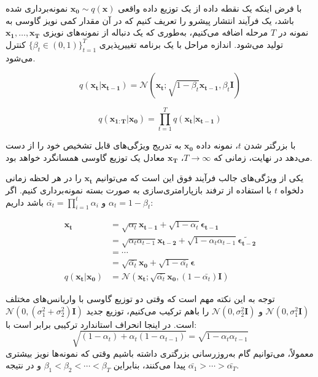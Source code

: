 با فرض اینکه یک نقطه داده از یک توزیع داده واقعی $ \mathbf{x_0} \sim q(\mathbf{x}) $ نمونه‌برداری شده باشد، یک فرآیند انتشار پیشرو را تعریف کنیم که در آن مقدار کمی نویز گاوسی به نمونه در $ T $ مرحله اضافه می‌کنیم، به‌طوری که یک دنباله از نمونه‌های نویزی $ \mathbf{x_1}, \ldots, \mathbf{x_T} $ تولید می‌شود. اندازه مراحل با یک برنامه تغییرپذیری $\{\beta_t \in (0, 1)\}_{t=1}^{T}$ کنترل می‌شود.

\begin{equation}
	q(\mathbf{x_t}|\mathbf{x_{t-1}}) = \mathcal{N}(\mathbf{x_t}; \sqrt{1 - \beta_t} \mathbf{x_{t-1}}, \beta_t \mathbf{I})
\end{equation}

\begin{equation}
	q(\mathbf{x_{1:T}}|\mathbf{x_0}) = \prod_{t=1}^{T} q(\mathbf{x_t}|\mathbf{x_{t-1}})
\end{equation}

با بزرگتر شدن $ t $، نمونه داده $ \mathbf{x_0} $ به تدریج ویژگی‌های قابل تشخیص خود را از دست می‌دهد  در نهایت، زمانی که $ T \to \infty $، $\mathbf{x_T}$ معادل یک توزیع گاوسی همسانگرد خواهد بود.






یکی از ویژگی‌های جالب فرآیند فوق این است که می‌توانیم $\mathbf{x_t}$ را در هر لحظه زمانی دلخواه $t$ با استفاده از ترفند بازپارامتری‌سازی به صورت بسته نمونه‌برداری کنیم. اگر $\alpha_t = 1 - \beta_t$ و $\bar{\alpha_t} = \prod_{i=1}^{t} \alpha_i$ باشد داریم:

\begin{equation}
	\begin{aligned}
		\mathbf{x_t} &= \sqrt{\alpha_t} \mathbf{x_{t-1}} + \sqrt{1 - \alpha_t} \boldsymbol{\epsilon_{t-1}} \\
		&= \sqrt{\alpha_t \alpha_{t-1}} \mathbf{x_{t-2}} + \sqrt{1 - \alpha_t \alpha_{t-1}} \boldsymbol{\tilde{\epsilon_{t-2}}} \\
		&= \cdots \\
		&= \sqrt{\bar{\alpha_t}} \mathbf{x_0} + \sqrt{1 - \bar{\alpha_t}} \boldsymbol{\epsilon} \\
		q(\mathbf{x_t}|\mathbf{x_0}) &= \mathcal{N}(\mathbf{x_t}; \sqrt{\bar{\alpha_t}} \mathbf{x_0}, (1 - \bar{\alpha_t}) \mathbf{I})
	\end{aligned}
\end{equation}

توجه به این نکته مهم است که وقتی دو توزیع گاوسی با واریانس‌های مختلف $\mathcal{N}(0, \sigma_1^2 \mathbf{I})$ و $\mathcal{N}(0, \sigma_2^2 \mathbf{I})$ را باهم ترکیب می‌کنیم، توزیع جدید $\mathcal{N}(0, (\sigma_1^2 + \sigma_2^2) \mathbf{I})$ است. در اینجا انحراف استاندارد ترکیبی برابر است با:
\begin{equation}
	\sqrt{(1 - \alpha_t) + \alpha_t (1 - \alpha_{t-1})} = \sqrt{1 - \alpha_t \alpha_{t-1}}
\end{equation}
معمولاً، می‌توانیم گام به‌روزرسانی بزرگتری داشته باشیم وقتی که نمونه‌ها نویز بیشتری پیدا می‌کنند، بنابراین $\beta_1 < \beta_2 < \cdots < \beta_T$ و در نتیجه $\bar{\alpha_1} > \cdots > \bar{\alpha_T}$.







